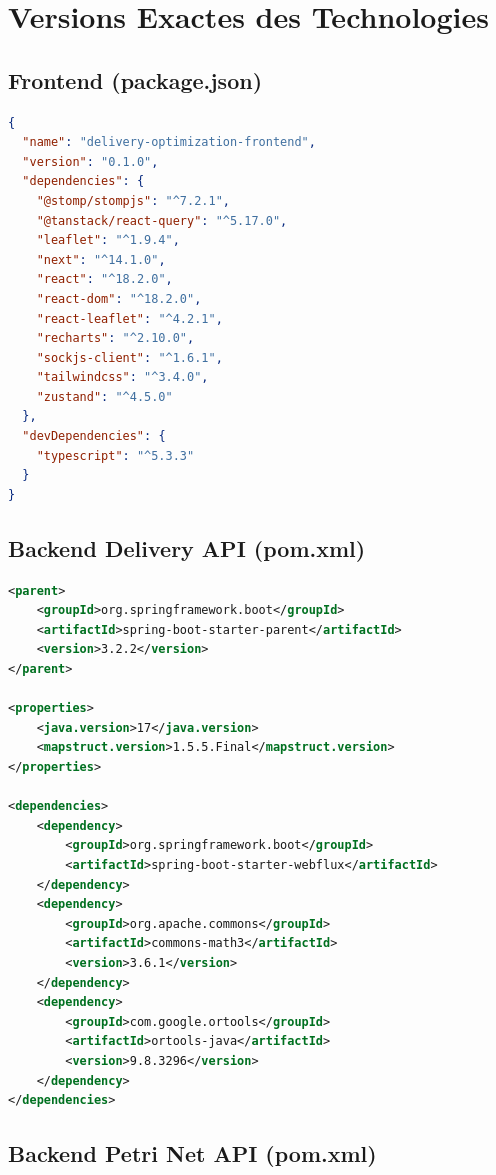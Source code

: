 \section{Versions Exactes des Technologies}

\subsection{Frontend (package.json)}

\begin{lstlisting}[language=json, caption={Versions Frontend - package.json (extrait)}, label={lst:package-json}]
{
  "name": "delivery-optimization-frontend",
  "version": "0.1.0",
  "dependencies": {
    "@stomp/stompjs": "^7.2.1",
    "@tanstack/react-query": "^5.17.0",
    "leaflet": "^1.9.4",
    "next": "^14.1.0",
    "react": "^18.2.0",
    "react-dom": "^18.2.0",
    "react-leaflet": "^4.2.1",
    "recharts": "^2.10.0",
    "sockjs-client": "^1.6.1",
    "tailwindcss": "^3.4.0",
    "zustand": "^4.5.0"
  },
  "devDependencies": {
    "typescript": "^5.3.3"
  }
}
\end{lstlisting}

\subsection{Backend Delivery API (pom.xml)}

\begin{lstlisting}[language=xml, caption={Versions Backend Delivery - pom.xml (extrait)}, label={lst:pom-delivery}]
<parent>
    <groupId>org.springframework.boot</groupId>
    <artifactId>spring-boot-starter-parent</artifactId>
    <version>3.2.2</version>
</parent>

<properties>
    <java.version>17</java.version>
    <mapstruct.version>1.5.5.Final</mapstruct.version>
</properties>

<dependencies>
    <dependency>
        <groupId>org.springframework.boot</groupId>
        <artifactId>spring-boot-starter-webflux</artifactId>
    </dependency>
    <dependency>
        <groupId>org.apache.commons</groupId>
        <artifactId>commons-math3</artifactId>
        <version>3.6.1</version>
    </dependency>
    <dependency>
        <groupId>com.google.ortools</groupId>
        <artifactId>ortools-java</artifactId>
        <version>9.8.3296</version>
    </dependency>
</dependencies>
\end{lstlisting}

\subsection{Backend Petri Net API (pom.xml)}

